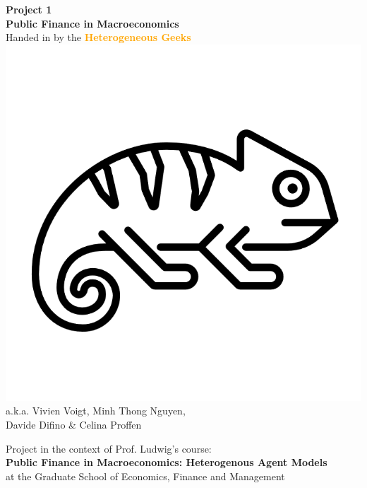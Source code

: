 \documentclass[12pt,a4paper]{article}
\begin{document}
\begin{center}
       \vspace*{1cm}
       \huge\textbf{Project 1} \\
       \vspace{0.4cm}
       \large \textbf{Public Finance in Macroeconomics} \\
       \vspace{0.5cm}
        \large Handed in by the \textcolor{orange}{\textbf{Heterogeneous Geeks}} \\

        \includegraphics[scale=0.1]{graph/geek.png} \\
        \vspace{0.3cm}
        a.k.a. Vivien Voigt, Minh Thong Nguyen, \\Davide Difino \& Celina Proffen \\
       \vspace{1.5cm}
       \vfill
       

        Project in the context of Prof. Ludwig's course: \\
        \textbf{Public Finance in Macroeconomics: Heterogenous Agent Models}\\
        at the Graduate School of Economics, Finance and Management
       \vspace{0.8cm}
   \end{center}
\end{document}

